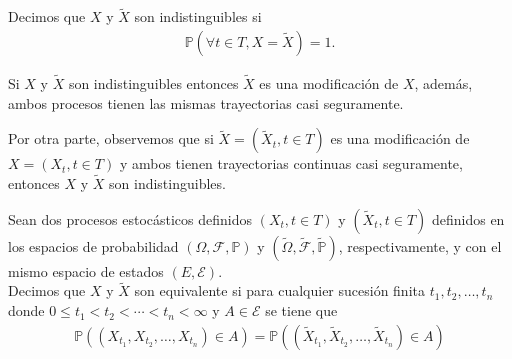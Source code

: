 \begin{definition}
Decimos que $X$ y $\tilde{X}$ son indistinguibles si
  \begin{align*}
	\mathbb{P} \left( \forall t \in T, X = \tilde{X} \right) = 1.
  \end{align*}
  
Si $X$ y $\tilde{X}$ son indistinguibles entonces $\tilde{X}$ es una modificación de $X$, además, ambos procesos tienen las mismas trayectorias casi seguramente.
\end{definition}

Por otra parte, observemos que si $\tilde{X} = (\tilde{X}_t, t \in T)$ es una modificación de $X = (X_t, t \in T)$ y ambos tienen trayectorias continuas casi seguramente, entonces $X$ y $\tilde{X}$ son indistinguibles.

\begin{definition}
Sean dos procesos estocásticos definidos $(X_t, t \in T)$ y $(\tilde{X}_t, t \in T)$ definidos en los espacios de probabilidad $(\Omega, \mathcal{F}, \mathbb{P})$ y $(\tilde{\Omega}, \tilde{\mathcal{F}}, \tilde{\mathbb{P}})$, respectivamente, y con el mismo espacio de estados $(E, \mathcal{E})$. \\

Decimos que $X$ y $\tilde{X}$ son equivalente si para cualquier sucesión finita $t_1, t_2, \ldots, t_n$ donde $0 \leq t_1 < t_2 < \cdots < t_n < \infty$ y $A \in \mathcal{E}$ se tiene que
	\begin{align*}
	\mathbb{P} \left( (X_{t_1}, X_{t_2}, \ldots, X_{t_n}) \in A \right) = \mathbb{P} \left( (\tilde{X}_{t_1}, \tilde{X}_{t_2}, \ldots, \tilde{X}_{t_n}) \in A \right)
	\end{align*}
\end{definition}

